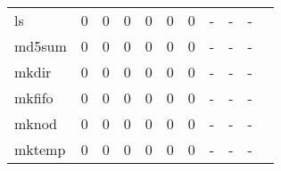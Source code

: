 \begin{longtable}{lp{1.2cm}p{1.2cm}p{1.2cm}p{1.2cm}p{1.2cm}p{1.2cm}p{1.2cm}p{1.2cm}p{1.2cm}p{1.2cm}}
ls        &                                     0 &                                                  0 &                                                  0 &                                                  0 &                                                  0 &                                                  0 &                                                  - &                                                  - &                                                  - \\
md5sum    &                                     0 &                                                  0 &                                                  0 &                                                  0 &                                                  0 &                                                  0 &                                                  - &                                                  - &                                                  - \\
mkdir     &                                     0 &                                                  0 &                                                  0 &                                                  0 &                                                  0 &                                                  0 &                                                  - &                                                  - &                                                  - \\
mkfifo    &                                     0 &                                                  0 &                                                  0 &                                                  0 &                                                  0 &                                                  0 &                                                  - &                                                  - &                                                  - \\
mknod     &                                     0 &                                                  0 &                                                  0 &                                                  0 &                                                  0 &                                                  0 &                                                  - &                                                  - &                                                  - \\
mktemp    &                                     0 &                                                  0 &                                                  0 &                                                  0 &                                                  0 &                                                  0 &                                                  - &                                                  - &                                                  - \\

\end{longtable}
